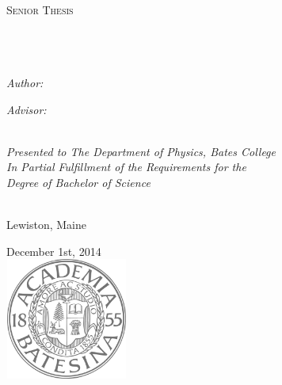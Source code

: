 \documentclass[11pt, oneside]{Thesis} %
\begin{document}
\begin{titlepage}
\begin{center}

\textsc{\LARGE \univname}\\[1.5cm] %
\textsc{\Large Senior Thesis}\\[0.5cm] %

\HRule \\[0.4cm] %
{\huge \bfseries \ttitle}\\[0.4cm] %
\HRule \\[1.5cm] %
 
\begin{minipage}{0.4\textwidth}
\begin{flushleft} \large
\emph{Author:}\\
\href{http://www.peterkrieg.com/thesis}{\authornames} %
\end{flushleft}
\end{minipage}
\begin{minipage}{0.4\textwidth}
\begin{flushright} \large
\emph{Advisor:} \\
\supname %
\end{flushright}
\end{minipage}\\[3cm]
 
\large \textit{Presented to The Department of Physics, Bates College\\ In Partial Fulfillment of the Requirements for the \\ Degree of Bachelor of Science}\\[0.3cm] %

\

 \large Lewiston, Maine 
 \

{\large December 1st, 2014}\\[2cm] %
\includegraphics[width=4cm, height=4cm]{logotransparent.png} %
 
\vfill
\end{center}

\end{titlepage}
\end{document}
